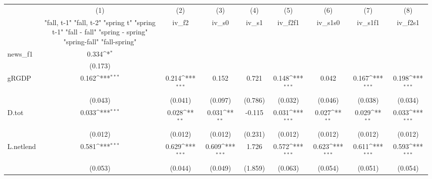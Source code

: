 {
\def\sym#1{\ifmmode^{#1}\else\(^{#1}\)\fi}
\begin{tabular}{l*{8}{c}}
\toprule
            &\multicolumn{1}{c}{(1)}&\multicolumn{1}{c}{(2)}&\multicolumn{1}{c}{(3)}&\multicolumn{1}{c}{(4)}&\multicolumn{1}{c}{(5)}&\multicolumn{1}{c}{(6)}&\multicolumn{1}{c}{(7)}&\multicolumn{1}{c}{(8)}\\
            &\multicolumn{1}{c}{  "fall, t-1" "fall, t-2" "spring t" "spring t-1"  "fall - fall" "spring - spring" "spring-fall" "fall-spring" }&\multicolumn{1}{c}{iv\_f2}&\multicolumn{1}{c}{iv\_s0}&\multicolumn{1}{c}{iv\_s1}&\multicolumn{1}{c}{iv\_f2f1}&\multicolumn{1}{c}{iv\_s1s0}&\multicolumn{1}{c}{iv\_s1f1}&\multicolumn{1}{c}{iv\_f2s1}\\
\midrule
news\_f1     &       0.334\sym{*}  &                     &                     &                     &                     &                     &                     &                     \\
            &     (0.173)         &                     &                     &                     &                     &                     &                     &                     \\
\addlinespace
gRGDP       &       0.162\sym{***}&       0.214\sym{***}&       0.152         &       0.721         &       0.148\sym{***}&       0.042         &       0.167\sym{***}&       0.198\sym{***}\\
            &     (0.043)         &     (0.041)         &     (0.097)         &     (0.786)         &     (0.032)         &     (0.046)         &     (0.038)         &     (0.034)         \\
\addlinespace
D.tot       &       0.033\sym{***}&       0.028\sym{**} &       0.031\sym{**} &      -0.115         &       0.031\sym{***}&       0.027\sym{**} &       0.029\sym{**} &       0.033\sym{***}\\
            &     (0.012)         &     (0.012)         &     (0.012)         &     (0.231)         &     (0.012)         &     (0.012)         &     (0.012)         &     (0.012)         \\
\addlinespace
L.netlend   &       0.581\sym{***}&       0.629\sym{***}&       0.609\sym{***}&       1.726         &       0.572\sym{***}&       0.623\sym{***}&       0.611\sym{***}&       0.593\sym{***}\\
            &     (0.053)         &     (0.044)         &     (0.049)         &     (1.859)         &     (0.063)         &     (0.054)         &     (0.051)         &     (0.054)         \\

\end{tabular}}
